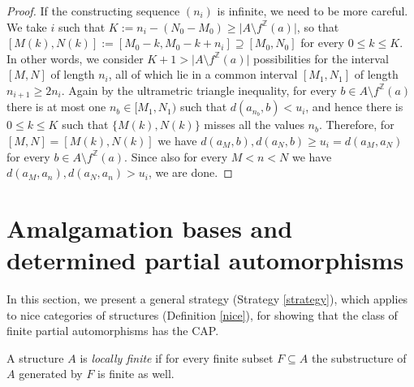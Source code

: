 \documentclass[10pt,a4paper]{article}
\theoremstyle{definition}
\theoremstyle{remark}
\newcommand \set [1]{\{#1\}}
\newcommand \card [1] {\lvert#1\rvert} %
\newcommand \Z {\mathbb{Z}}
\begin{document}
\begin{proof}
    If the constructing sequence $(n_i)$ is infinite, we need to be more careful.
    We take $i$ such that $K := n_i - (N_0 - M_0) \geq \card{A \setminus f^\Z(a)}$, so that $[M(k), N(k)] := [M_0 - k, M_0 - k + n_i] \supseteq [M_0, N_0]$ for every $0 \leq k \leq K$.
    In other words, we consider $K + 1 > \card{A \setminus f^\Z(a)}$ possibilities for the interval $[M, N]$ of length $n_i$, all of which lie in a common interval $[M_1, N_1]$ of length $n_{i + 1} \geq 2n_i$.
    Again by the ultrametric triangle inequality, for every $b \in A \setminus f^\Z(a)$ there is at most one $n_b \in [M_1, N_1)$ such that $d(a_{n_b}, b) < u_i$, and hence there is $0 \leq k \leq K$ such that $\set{M(k), N(k)}$ misses all the values $n_b$.
    Therefore, for $[M, N] = [M(k), N(k)]$ we have $d(a_M, b), d(a_N, b) \geq u_i = d(a_M, a_N)$ for every $b \in A \setminus f^\Z(a)$.
    Since also for every $M < n < N$ we have $d(a_M, a_n), d(a_N, a_n) > u_i$, we are done.
\end{proof}




\color{black}





\section{Amalgamation bases and determined partial automorphisms}

In this section, we present a general strategy (Strategy \ref{strategy}), which applies to nice categories of structures (Definition \ref{nice}), for showing that the class of finite partial automorphisms has the CAP.






A structure $A$ is \emph{locally finite} if for every finite subset $F \subseteq A$ the substructure of $A$ generated by $F$ is finite as well.
\end{document}

